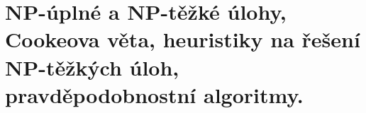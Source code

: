 \section[TAL - NP (complete, hard), Cookeova věta]{NP-úplné a NP-těžké úlohy, Cookeova věta, heuristiky na řešení NP-těžkých úloh, pravděpodobnostní algoritmy.}

